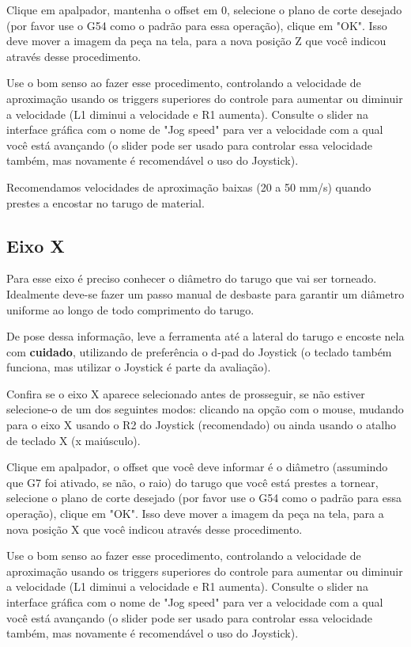 \documentclass[twoside,a4paper]{refart}
\begin{document}
Clique em apalpador, mantenha o offset em 0, selecione o plano de corte desejado (por favor use o G54 como o padrão para essa operação), clique em "OK". Isso deve mover a imagem da peça na tela, para a nova posição Z que você indicou através desse procedimento.

\attention Use o bom senso ao fazer esse procedimento, controlando a velocidade de aproximação usando os triggers superiores do controle para aumentar ou diminuir a velocidade (L1 diminui a velocidade e R1 aumenta). Consulte o slider na interface gráfica com o nome de "Jog speed" para ver a velocidade com a qual você está avançando (o slider pode ser usado para controlar essa velocidade também, mas novamente é recomendável o uso do Joystick). 

\attention Recomendamos velocidades de aproximação baixas (20 a 50 mm/s) quando prestes a encostar no tarugo de material.

\subsection{Eixo X}

Para esse eixo é preciso conhecer o diâmetro do tarugo que vai ser torneado. Idealmente deve-se fazer um passo manual de desbaste para garantir um diâmetro uniforme ao longo de todo comprimento do tarugo.

De pose dessa informação, leve a ferramenta até a lateral do tarugo e encoste nela com \textbf{cuidado}, utilizando de preferência o d-pad do Joystick (o teclado também funciona, mas utilizar o Joystick é parte da avaliação). 

Confira se o eixo X aparece selecionado antes de prosseguir, se não estiver selecione-o de um dos seguintes modos: clicando na opção com o mouse, mudando para o eixo X usando o R2 do Joystick (recomendado) ou ainda usando o atalho de teclado X (x maiúsculo).

Clique em apalpador, o offset que você deve informar é o diâmetro (assumindo que G7 foi ativado, se não, o raio) do tarugo que você está prestes a tornear, selecione o plano de corte desejado (por favor use o G54 como o padrão para essa operação), clique em "OK". Isso deve mover a imagem da peça na tela, para a nova posição X que você indicou através desse procedimento.

\attention Use o bom senso ao fazer esse procedimento, controlando a velocidade de aproximação usando os triggers superiores do controle para aumentar ou diminuir a velocidade (L1 diminui a velocidade e R1 aumenta). Consulte o slider na interface gráfica com o nome de "Jog speed" para ver a velocidade com a qual você está avançando (o slider pode ser usado para controlar essa velocidade também, mas novamente é recomendável o uso do Joystick). 
\end{document}

